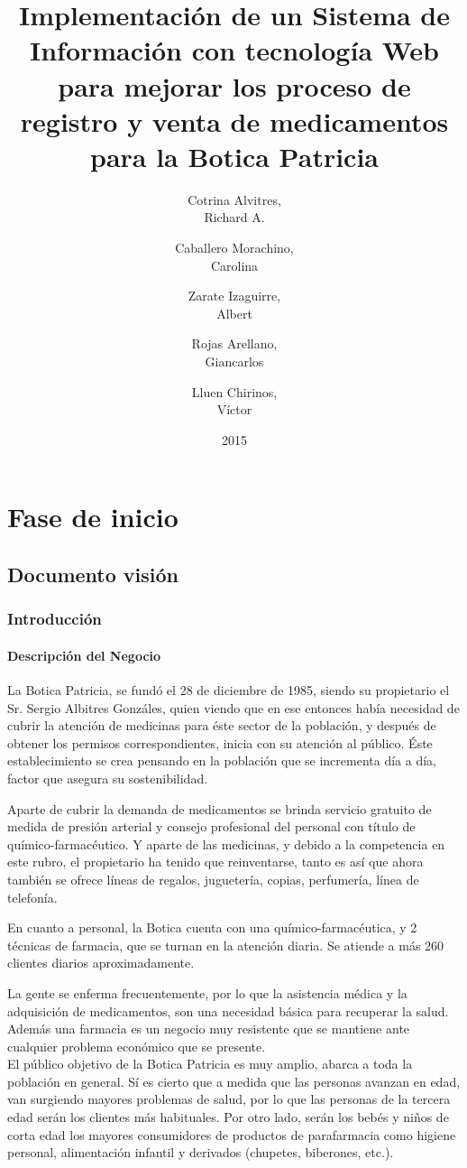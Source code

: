\documentclass[a4paper,11pt, spanish]{report}
\title{\Huge \textbf{Implementación de un Sistema de Información con tecnología Web para mejorar los proceso de registro y venta de medicamentos para la Botica Patricia\\[3em]}}
\author{
  \Large Cotrina Alvitres,\\
  Richard A.\\[2em]
  \and
  \Large Caballero Morachino,\\
  Carolina\\[2em]
  \and
  \Large Zarate Izaguirre, \\
  Albert\\[2em]
  \and
  \Large Rojas Arellano, \\
  Giancarlos\\[2em]
  \and
  \Large Lluen Chirinos, \\
  Víctor\\[2em] 
}
\date{\LARGE 2015}
\begin{document}
\maketitle

\tableofcontents
\listoftables
\listoffigures

\part{Fase de inicio}
  \chapter{Documento visión}
    \section{Introducción}
      \subsection{Descripción del Negocio}
        La Botica Patricia, se fundó el 28 de diciembre de 1985, siendo su propietario el Sr. Sergio Albitres Gonzáles, quien viendo que en ese entonces había necesidad de cubrir la atención de medicinas para éste sector de la población, y después de obtener los permisos correspondientes, inicia con su atención al público.         
Éste establecimiento se crea pensando en la población que se incrementa día a día, factor que asegura su sostenibilidad.

Aparte de cubrir la demanda de medicamentos se brinda servicio gratuito de medida de presión arterial y consejo profesional del personal con título de químico-farmacéutico. Y aparte de las medicinas, y debido a la competencia en este rubro, el propietario ha tenido que reinventarse, tanto es así que ahora también se ofrece líneas de regalos, juguetería, copias, perfumería, línea de telefonía.

En cuanto a personal, la Botica cuenta con una químico-farmacéutica, y 2 técnicas de farmacia, que se turnan en la atención diaria. Se atiende a más 260 clientes diarios aproximadamente.

La gente se enferma frecuentemente, por lo que la asistencia médica y la adquisición de medicamentos, son una necesidad básica para recuperar la salud. Además una farmacia es un negocio muy resistente que se mantiene ante cualquier problema económico que se presente. \\
El público objetivo de la Botica Patricia es muy amplio, abarca a toda la población en general. Sí es cierto que a medida que las personas avanzan en edad, van surgiendo mayores problemas de salud, por lo que las personas de la tercera edad serán los clientes más habituales.
Por otro lado, serán los bebés y niños de corta edad los mayores consumidores de productos de parafarmacia como higiene personal, alimentación infantil y derivados (chupetes, biberones, etc.).
\end{document}
